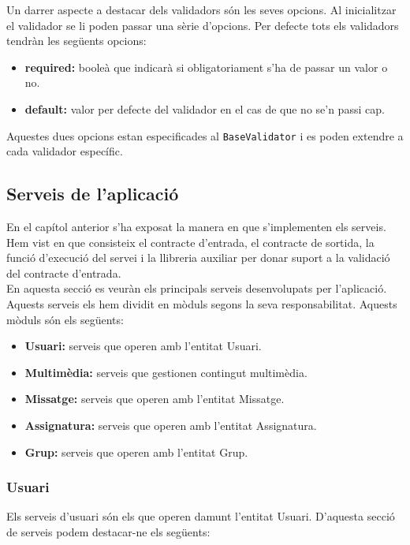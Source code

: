 	 Un darrer aspecte a destacar dels validadors són les seves opcions. Al inicialitzar el validador se li poden passar una sèrie d'opcions. Per defecte tots els validadors tendràn les següents opcions:
	 
	 \begin{itemize}
	 	\item \textbf{required:} booleà que indicarà si obligatoriament s'ha de passar un valor o no.
	 	\item \textbf{default:} valor per defecte del validador en el cas de que no se'n passi cap.
	 \end{itemize}
	 
	 Aquestes dues opcions estan especificades al \texttt{BaseValidator} i es poden extendre a cada validador específic.
	 
	\subsection{Serveis de l'aplicació} \label{serveis_aplicacio}
	
		En el capítol anterior s'ha exposat la manera en que s'implementen els serveis. Hem vist en que consisteix el contracte d'entrada, el contracte de sortida, la funció d'execució del servei i la llibreria auxiliar per donar suport a la validació del contracte d'entrada.\\
		
		En aquesta secció es veuràn els principals serveis desenvolupats per l'aplicació. Aquests serveis els hem dividit en mòduls segons la seva responsabilitat. Aquests mòduls són els següents:
		
		\begin{itemize}
			\item \textbf{Usuari:} serveis que operen amb l'entitat Usuari.
			\item \textbf{Multimèdia:} serveis que gestionen contingut multimèdia.
			\item \textbf{Missatge:} serveis que operen amb l'entitat Missatge.
			\item \textbf{Assignatura:} serveis que operen amb l'entitat Assignatura.
			\item \textbf{Grup:} serveis que operen amb l'entitat Grup.
		\end{itemize}
		\subsubsection{Usuari}
			
		Els serveis d'usuari són els que operen damunt l'entitat Usuari. D'aquesta secció de serveis podem destacar-ne els següents:
		

